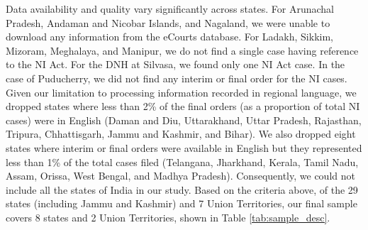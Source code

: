 \documentclass[12pt,a4paper]{article}
\begin{document}
		
		Data availability and quality vary significantly across states. For Arunachal Pradesh, Andaman and Nicobar Islands, and Nagaland, we were unable to download any information from the eCourts database. For Ladakh, Sikkim, Mizoram, Meghalaya, and Manipur, we do not find a single case having reference to the NI Act. For the DNH at Silvasa, we found only one NI Act case. In the case of Puducherry, we did not find any interim or final order for the NI cases. Given our limitation to processing information recorded in regional language, we dropped states where less than 2\% of the final orders (as a proportion of total NI cases) were in English (Daman and Diu, Uttarakhand, Uttar Pradesh, Rajasthan, Tripura, Chhattisgarh, Jammu and Kashmir, and Bihar). We also dropped eight states where interim or final orders were available in English but they represented less than 1\% of the total cases filed  (Telangana, Jharkhand, Kerala, Tamil Nadu, Assam, Orissa, West Bengal, and Madhya Pradesh). Consequently, we could not include all the states of India in our study. Based on the criteria above, of the 29 states (including Jammu and Kashmir) and 7 Union Territories, our final sample covers 8 states and 2 Union Territories, shown in Table \ref{tab:sample_desc}. 
		
\end{document}
